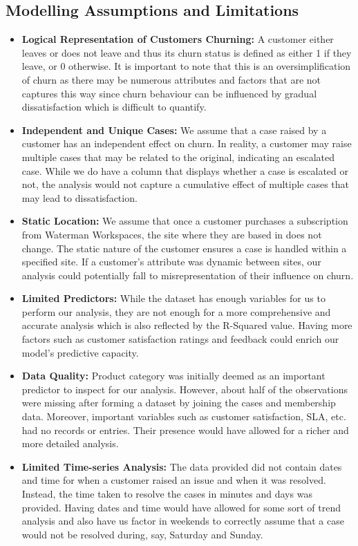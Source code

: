 \documentclass[
]{article}
\begin{document}
\subsection{Modelling Assumptions and Limitations}\label{modelling-assumptions-and-limitations}

\begin{itemize}
\item
  \textbf{Logical Representation of Customers Churning:} A customer either leaves or does not leave and thus its churn status is defined as either 1 if they leave, or 0 otherwise. It is important to note that this is an oversimplification of churn as there may be numerous attributes and factors that are not captures this way since churn behaviour can be influenced by gradual dissatisfaction which is difficult to quantify.
\item
  \textbf{Independent and Unique Cases:} We assume that a case raised by a customer has an independent effect on churn. In reality, a customer may raise multiple cases that may be related to the original, indicating an escalated case. While we do have a column that displays whether a case is escalated or not, the analysis would not capture a cumulative effect of multiple cases that may lead to dissatisfaction.
\item
  \textbf{Static Location:} We assume that once a customer purchases a subscription from Waterman Workspaces, the site where they are based in does not change. The static nature of the customer ensures a case is handled within a specified site. If a customer's attribute was dynamic between sites, our analysis could potentially fall to misrepresentation of their influence on churn.
\item
  \textbf{Limited Predictors:} While the dataset has enough variables for us to perform our analysis, they are not enough for a more comprehensive and accurate analysis which is also reflected by the R-Squared value. Having more factors such as customer satisfaction ratings and feedback could enrich our model's predictive capacity.
\item
  \textbf{Data Quality:} Product category was initially deemed as an important predictor to inspect for our analysis. However, about half of the observations were missing after forming a dataset by joining the cases and membership data. Moreover, important variables such as customer satisfaction, SLA, etc. had no records or entries. Their presence would have allowed for a richer and more detailed analysis.
\item
  \textbf{Limited Time-series Analysis:} The data provided did not contain dates and time for when a customer raised an issue and when it was resolved. Instead, the time taken to resolve the cases in minutes and days was provided. Having dates and time would have allowed for some sort of trend analysis and also have us factor in weekends to correctly assume that a case would not be resolved during, say, Saturday and Sunday.

\end{itemize}
\end{document}
